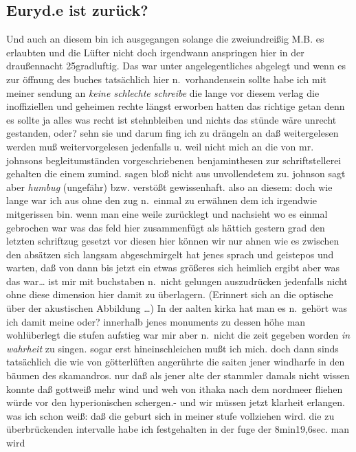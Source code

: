 \documentclass[
]{article}
\author{}
\date{\vspace{-2.5em}}
\begin{document}
\subsection{Euryd.e ist zurück?}\label{euryd.e-ist-zuruxfcck}

Und auch an diesem bin ich ausgegangen solange die zweiundreißig M.B. es
erlaubten und die Lüfter nicht doch irgendwann anspringen hier in der
draußennacht 25gradluftig. Das war unter angelegentliches abgelegt und
wenn es zur öffnung des buches tatsächlich hier n.~vorhandensein sollte
habe ich mit meiner sendung an \emph{keine schlechte schreibe} die lange
vor diesem verlag die inoffiziellen und geheimen rechte längst erworben
hatten das richtige getan denn es sollte ja alles was recht ist
stehnbleiben und nichts das stünde wäre unrecht gestanden, oder? sehn
sie und darum fing ich zu drängeln an daß weitergelesen werden muß
weitervorgelesen jedenfalls u. weil nicht mich an die von mr. johnsons
begleitumständen vorgeschriebenen benjaminthesen zur schriftstellerei
gehalten die einem zumind. sagen bloß nicht aus unvollendetem zu.
johnson sagt aber \emph{humbug} (ungefähr) bzw. verstößt gewissenhaft.
also an diesem: doch wie lange war ich aus ohne den zug n.~einmal zu
erwähnen dem ich irgendwie mitgerissen bin. wenn man eine weile
zurücklegt und nachsieht wo es einmal gebrochen war was das feld hier
zusammenfügt als hättich gestern grad den letzten schriftzug gesetzt vor
diesen hier können wir nur ahnen wie es zwischen den absätzen sich
langsam abgeschmirgelt hat jenes sprach und geistepos und warten, daß
von dann bis jetzt ein etwas größeres sich heimlich ergibt aber was das
war\ldots{} ist mir mit buchstaben n.~nicht gelungen auszudrücken
jedenfalls nicht ohne diese dimension hier damit zu überlagern.
(Erinnert sich an die optische über der akustischen Abbildung \ldots) In
der aalten kirka hat man es n.~gehört was ich damit meine oder?
innerhalb jenes monuments zu dessen höhe man wohlüberlegt die stufen
aufstieg war mir aber n.~nicht die zeit gegeben worden \emph{in
wahrheit} zu singen. sogar erst hineinschleichen mußt ich mich. doch
dann sinds tatsächlich die wie von götterlüften angerührte die saiten
jener windharfe in den bäumen des skamandros. nur daß als jener alte der
stammler damals nicht wissen konnte daß gottweiß mehr wind und weh von
ithaka nach dem nordmeer fliehen würde vor den hyperionischen schergen.-
und wir müssen jetzt klarheit erlangen. was ich schon weiß: daß die
geburt sich in meiner stufe vollziehen wird. die zu überbrückenden
intervalle habe ich festgehalten in der fuge der 8min19,6sec. man wird
\end{document}
